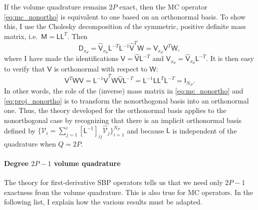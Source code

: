 \documentclass[pdflatex,sn-mathphys-num]{sn-jnl}%
\theoremstyle{thmstyleone}%
\theoremstyle{thmstyletwo}%
\theoremstyle{thmstylethree}%
\newcommand{\mat}[1]{\ensuremath{\mathsf{#1}}}
\newcommand{\fnc}[1]{\ensuremath{\mathcal{#1}}}
\begin{document}
If the volume quadrature remains $2P$ exact, then the MC operator \eqref{eq:mc_nonortho} is equivalent to one based on an orthonormal basis.  To show this, I use the Cholesky decomposition of the symmetric, positive definite mass matrix, i.e.~$\mat{M} = \mat{L} \mat{L}^T$.  Then
\begin{equation*}
    \mat{D}_{x_d} = \hat{\mat{V}}_{x_d} \mat{L}^{-T} \mat{L}^{-1} \hat{\mat{V}}^T \mat{W} = \mat{V}_{x_d} \mat{V}^{T} \mat{W},
\end{equation*}
where I have made the identifications $\mat{V} = \hat{\mat{V}} \mat{L}^{-T}$ and $\mat{V}_{x_d} = \hat{\mat{V}}_{x_d} \mat{L}^{-T}$.  It is then easy to verify that $\mat{V}$ is orthonormal with respect to $\mat{W}$:
\begin{equation*}
    \mat{V}^T \mat{W} \mat{V} = \mat{L}^{-1} \hat{\mat{V}}^T \mat{W} \hat{\mat{V}} \mat{L}^{-T} = \mat{L}^{-1} \mat{L} \mat{L}^T \mat{L}^{-T} = \mat{I}_{N_P}.
\end{equation*}
In other words, the role of the (inverse) mass matrix in \eqref{eq:mc_nonortho} and \eqref{eq:proj_nonortho} is to transform the nonorthogonal basis into an orthonormal one.  Thus, the theory developed for the orthonormal basis applies to the nonorthogonal case by recognizing that there is an implicit orthonormal basis defined by $\{ \fnc{V}_i = \sum_{j=1}^{i} [\mat{L}^{-1}]_{ij} \hat{\fnc{V}}_j \}_{i=1}^{N_P}$ and because $\mat{L}$ is independent of the quadrature when $Q=2P$.

\paragraph{Degree $2P-1$ volume quadrature}

The theory for first-derivative SBP operators tells us that we need only $2P-1$ exactness from the volume quadrature.  This is also true for MC operators.  In the following list, I explain how the various results must be adapted.
\end{document}
